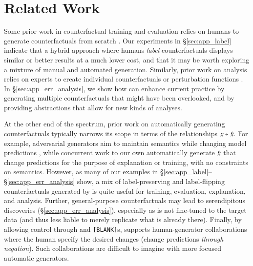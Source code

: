 \section{Related Work}
\label{sec:relate}
Some prior work in counterfactual training and evaluation relies on humans to generate counterfactuals from scratch \cite{gardner2020contrast, teney2020learning, kaushik2019learning}. 
Our experiments in \S\ref{sec:app_label} indicate that a hybrid approach where humans \emph{label} \sysname{} counterfactuals displays similar or better results at a much lower cost, and that it may be worth exploring a mixture of manual and automated generation. 
Similarly, prior work on analysis relies on experts to create individual counterfactuals or perturbation functions \cite{wu2019errudite, checklist:acl20}. 
In \S\ref{sec:app_err_analysis}, we show how \sysname{} can enhance current practice by generating multiple counterfactuals that might have been overlooked, and by providing abstractions that allow for new kinds of analyses.

At the other end of the spectrum, prior work on automatically generating counterfactuals typically narrows its scope in terms of the relationships $x \veryshortarrow \xp$.
For example, adversarial generators aim to maintain semantics while changing model predictions \cite{ribeiro2018semantically, iyyer2018adversarial, alzantot-etal-2018-generating}, while concurrent work to our own \cite{madaan2020generate, ross2020explaining} automatically generate $\hat{x}$ that change predictions for the purpose of explanation or training, with no constraints on semantics.
However, as many of our examples in \S\ref{sec:app_label}--\S\ref{sec:app_err_analysis} show, a mix of label-preserving and label-flipping counterfactuals generated by \sysname{} is quite useful for training, evaluation, explanation, and analysis. 
Further, general-purpose counterfactuals may lead to serendipitous discoveries (\eg \S\ref{sec:app_err_analysis}), especially as \sysname{} is not fine-tuned to the target data (and thus less liable to merely replicate what is already there).
Finally, by allowing control through \tagstrs and \texttt{[BLANK]}s, \sysname{} supports human-generator collaborations where the human specify the desired changes (\eg change predictions \emph{through negation}).
Such collaborations are difficult to imagine with more focused automatic generators.


